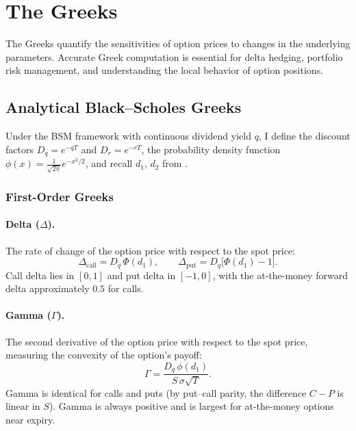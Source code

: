 \documentclass[11pt,a4paper]{article}
\begin{document}

\section{The Greeks}\label{sec:greeks}

The Greeks quantify the sensitivities of option prices to changes in the underlying parameters. Accurate Greek computation is essential for delta hedging, portfolio risk management, and understanding the local behavior of option positions.

\subsection{Analytical Black--Scholes Greeks}\label{subsec:analytical_greeks}

Under the BSM framework with continuous dividend yield $q$, I define the discount factors $D_q = e^{-qT}$ and $D_r = e^{-rT}$, the probability density function $\phi(x) = \frac{1}{\sqrt{2\pi}} e^{-x^2/2}$, and recall $d_1$, $d_2$ from .

\subsubsection{First-Order Greeks}

\paragraph{Delta ($\Delta$).}
The rate of change of the option price with respect to the spot price:
\begin{equation}\label{eq:delta}
    \Delta_{\text{call}} = D_q \, \Phi(d_1), \qquad
    \Delta_{\text{put}} = D_q \bigl[\Phi(d_1) - 1\bigr].
\end{equation}
Call delta lies in $[0, 1]$ and put delta in $[-1, 0]$, with the at-the-money forward delta approximately $0.5$ for calls.

\paragraph{Gamma ($\Gamma$).}
The second derivative of the option price with respect to the spot price, measuring the convexity of the option's payoff:
\begin{equation}\label{eq:gamma}
    \Gamma = \frac{D_q \, \phi(d_1)}{S \, \sigma \sqrt{T}}.
\end{equation}
Gamma is identical for calls and puts (by put--call parity, the difference $C - P$ is linear in $S$). Gamma is always positive and is largest for at-the-money options near expiry.
\end{document}
